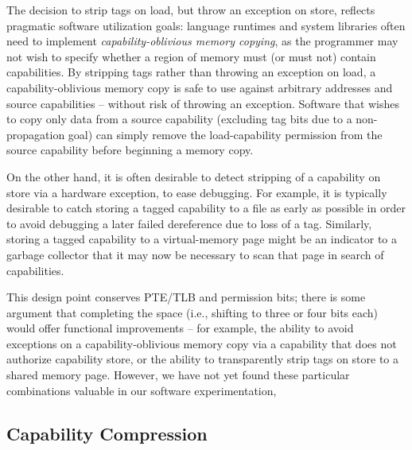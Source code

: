 The decision to strip tags on load, but throw an exception on
store, reflects
pragmatic software utilization goals: language runtimes and system libraries
often need to implement \textit{capability-oblivious memory copying}, as the
programmer may not wish to specify whether a region of memory must (or must
not) contain capabilities.
By stripping tags rather than throwing an exception on load, a
capability-oblivious memory copy is safe to use against arbitrary
addresses and source capabilities -- without risk of throwing an exception.
Software that wishes to copy only data from a source capability (excluding tag
bits due to a non-propagation goal) can simply remove the load-capability
permission from the source capability before beginning a memory copy.

On the other hand, it is often desirable to detect stripping of a capability on
store via a hardware exception, to ease debugging.
For example, it is typically desirable to catch storing a tagged capability to
a file as early as possible in order to avoid debugging a later failed
dereference due to loss of a tag.
Similarly, storing a tagged capability to a virtual-memory page might be an
indicator to a garbage collector that it may now be necessary to scan that
page in search of capabilities.

This design point conserves PTE/TLB and permission bits; there is some argument
that completing the space (i.e., shifting to three or four bits
each) would
offer functional improvements -- for example, the ability to avoid exceptions on
a capability-oblivious memory copy via a capability that does not authorize
capability store, or the ability to transparently strip tags on store to a
shared memory page.
However, we have not yet found these particular combinations valuable in our software experimentation, 

\subsection{Capability Compression}
\label{sec:model-compression}


